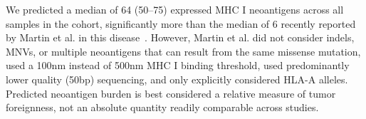 \documentclass[linenumbers]{bmcart}
\begin{document}








We predicted a median of 64 (50--75) expressed MHC I neoantigens across all samples in the cohort, significantly more than the median of 6 recently reported by Martin et al. in this disease~\cite{Martin_2016}. However, Martin et al. did not consider indels, MNVs, or multiple neoantigens that can result from the same missense mutation, used a 100nm instead of 500nm MHC I binding threshold, used predominantly lower quality (50bp) sequencing, and only explicitly considered HLA-A alleles. Predicted neoantigen burden is best considered a relative measure of tumor foreignness, not an absolute quantity readily comparable across studies.
\end{document}
